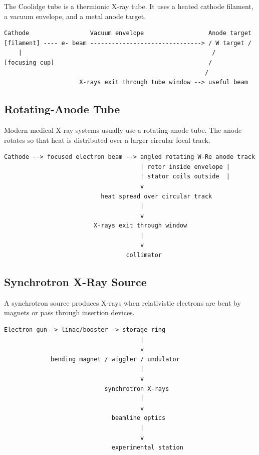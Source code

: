 \documentclass[12pt]{article}
\begin{document}
The Coolidge tube is a thermionic X-ray tube. It uses a heated cathode filament, a vacuum envelope, and a metal anode target.

\begin{lstlisting}
Cathode                 Vacuum envelope                  Anode target
[filament] ---- e- beam -------------------------------> / W target /
    |                                                     /
[focusing cup]                                           /
                                                        /
                     X-rays exit through tube window --> useful beam
\end{lstlisting}

\subsection{Rotating-Anode Tube}

Modern medical X-ray systems usually use a rotating-anode tube. The anode rotates so that heat is distributed over a larger circular focal track.

\begin{lstlisting}
Cathode --> focused electron beam --> angled rotating W-Re anode track
                                      | rotor inside envelope |
                                      | stator coils outside  |
                                      v
                           heat spread over circular track
                                      |
                                      v
                         X-rays exit through window
                                      |
                                      v
                                  collimator
\end{lstlisting}

\subsection{Synchrotron X-Ray Source}

A synchrotron source produces X-rays when relativistic electrons are bent by magnets or pass through insertion devices.

\begin{lstlisting}
Electron gun -> linac/booster -> storage ring
                                      |
                                      v
             bending magnet / wiggler / undulator
                                      |
                                      v
                            synchrotron X-rays
                                      |
                                      v
                              beamline optics
                                      |
                                      v
                              experimental station
\end{lstlisting}
\end{document}
